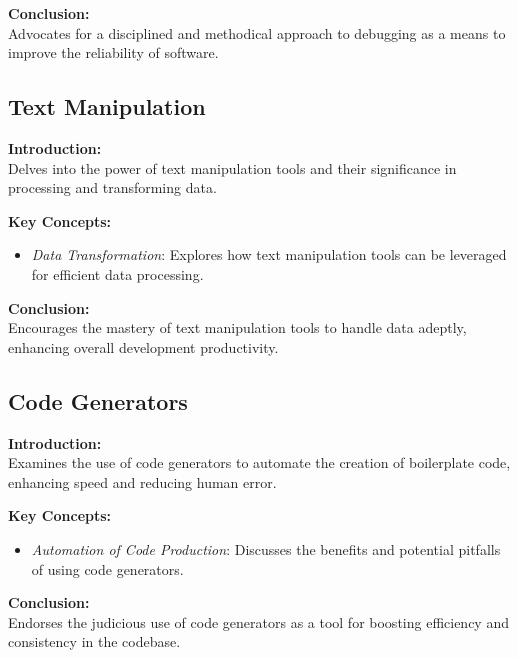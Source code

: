 \vspace{2mm}
\noindent\textbf{Conclusion:} \\
Advocates for a disciplined and methodical approach to debugging as a means to improve the reliability of software.

\subsection{Text Manipulation}

\textbf{Introduction:} \\
Delves into the power of text manipulation tools and their significance in processing and transforming data.

\vspace{2mm}
\noindent\textbf{Key Concepts:}
\begin{itemize}
  \item \textit{Data Transformation}: Explores how text manipulation tools can be leveraged for efficient data processing.
\end{itemize}

\vspace{2mm}
\noindent\textbf{Conclusion:} \\
Encourages the mastery of text manipulation tools to handle data adeptly, enhancing overall development productivity.

\subsection{Code Generators}

\textbf{Introduction:} \\
Examines the use of code generators to automate the creation of boilerplate code, enhancing speed and reducing human error.

\vspace{2mm}
\noindent\textbf{Key Concepts:}
\begin{itemize}
  \item \textit{Automation of Code Production}: Discusses the benefits and potential pitfalls of using code generators.
\end{itemize}

\vspace{2mm}
\noindent\textbf{Conclusion:} \\
Endorses the judicious use of code generators as a tool for boosting efficiency and consistency in the codebase.
